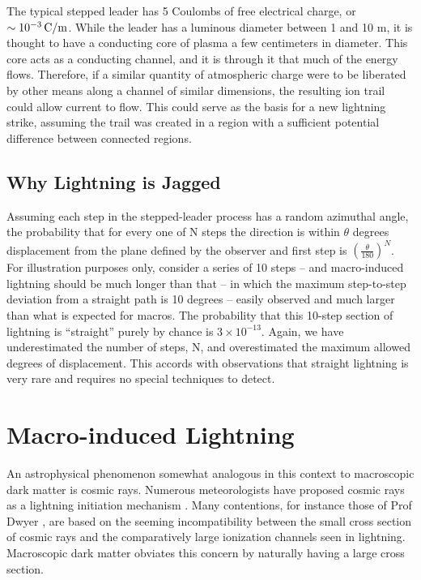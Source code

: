 \documentclass[%
 reprint,
 amsmath,amssymb,
 aps,
 nofootinbib, %
]{revtex4-2}
\begin{document}
    The typical stepped leader has 5 Coulombs of free electrical charge, or $\sim10^{-3} \, \rm{C/m}$. While the leader has a luminous diameter between 1 and 10 m, it is thought to have a conducting core of plasma a few centimeters in diameter. This core acts as a conducting channel, and it is through it that much of the energy flows. Therefore, if a similar quantity of atmospheric charge were to be liberated by other means along a channel of similar dimensions, the resulting ion trail could allow current to flow. This could serve as the basis for a new lightning strike, assuming the trail was created in a region with a sufficient potential difference between connected regions.
    
    
    \subsection*{Why Lightning is Jagged} %
    \label{sub:why_lightning_is_jagged}

        Assuming each step in the stepped-leader process has a random azimuthal angle, the probability that for every one of N steps the direction is within $\theta$ degrees displacement from the plane defined by the observer and first step is $\left(\frac{\theta}{180}\right)^{N}$. For illustration purposes only, consider a series of 10 steps  -- and macro-induced lightning should be much longer than that -- in which the maximum step-to-step deviation from a straight path is 10 degrees -- easily observed and much larger than what is expected for macros.
        The probability that this 10-step section of lightning is ``straight'' purely by chance is $3 \times 10^{-13}$. Again, we have underestimated the number of steps, N, and overestimated the maximum allowed degrees of displacement. This accords with observations that straight lightning is very rare and requires no special techniques to detect.
        



\section{Macro-induced \textbf{}Lightning} %
\label{sec:macro_induced_lightning}

    An astrophysical phenomenon somewhat analogous in this context to macroscopic dark matter is cosmic rays. Numerous meteorologists have proposed cosmic rays as a lightning initiation mechanism \citep{Babich2012}. Many contentions, for instance those of Prof Dwyer \citep{scientific_american_2008}, are based on the seeming incompatibility between the small cross section of cosmic rays and the comparatively large ionization channels seen in lightning. Macroscopic dark matter obviates this concern by naturally having a large cross section.
\end{document}
